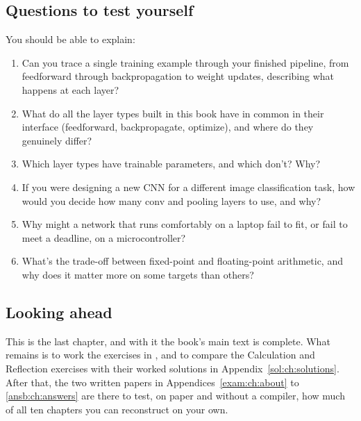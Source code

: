 \subsection*{Questions to test yourself}
You should be able to explain:
\begin{enumerate}
  \item Can you trace a single training example through your finished  pipeline,
    from feedforward through backpropagation to weight updates, describing what happens at each
    layer?
  \item What do all the layer types built in this book have in common in their interface
    (feedforward, backpropagate, optimize), and where do they genuinely differ?
  \item Which layer types have trainable parameters, and which don't? Why?
  \item If you were designing a new CNN for a different image classification task, how would you
    decide how many conv and pooling layers to use, and why?
  \item Why might a network that runs comfortably on a laptop fail to fit, or fail to meet a
    deadline, on a microcontroller?
  \item What's the trade-off between fixed-point and floating-point arithmetic, and why does it
    matter more on some targets than others?
\end{enumerate}

\subsection*{Looking ahead}
This is the last chapter, and with it the book's main text is complete. What remains is to work the
exercises in , and to compare the Calculation and Reflection exercises
with their worked solutions in Appendix~\ref{sol:ch:solutions}. After that, the two written papers
in Appendices~\ref{exam:ch:about} to \ref{ansb:ch:answers} are there to test, on paper and without a
compiler, how much of all ten chapters you can reconstruct on your own.
